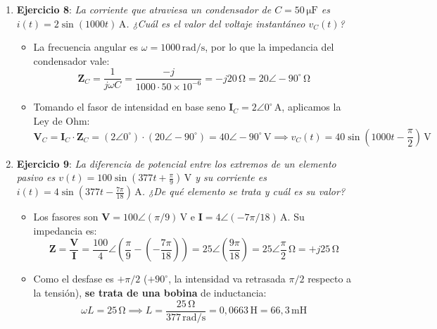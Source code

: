 \begin{ejercicio}
\begin{enumerate}
    \item \textbf{Ejercicio 8}: \emph{La corriente que atraviesa un condensador de $C = 50\,\si{\micro\farad}$ es $i(t) = 2\sin(1000 t)\,\si{\ampere}$. ¿Cuál es el valor del voltaje instantáneo $v_C(t)$?}
    \begin{itemize}
        \item La frecuencia angular es $\omega = 1000\,\si{\radian/\second}$, por lo que la impedancia del condensador vale:
        \begin{equation*}
            \mathbf{Z}_C = \frac{1}{j\omega C} = \frac{-j}{1000 \cdot 50\times 10^{-6}} = -j 20\,\si{\ohm} = 20\angle -90^\circ\,\si{\ohm}
        \end{equation*}
        \item Tomando el fasor de intensidad en base seno $\mathbf{I}_C = 2\angle 0^\circ\,\si{\ampere}$, aplicamos la Ley de Ohm:
        \begin{equation*}
            \mathbf{V}_C = \mathbf{I}_C \cdot \mathbf{Z}_C = (2\angle 0^\circ)\cdot(20\angle -90^\circ) = 40\angle -90^\circ\,\si{\volt} \implies \boxed{v_C(t) = 40\sin\left(1000 t - \frac{\pi}{2}\right)\,\si{\volt}}
        \end{equation*}
    \end{itemize}

    \item \textbf{Ejercicio 9}: \emph{La diferencia de potencial entre los extremos de un elemento pasivo es $v(t) = 100\sin\left(377 t + \frac{\pi}{9}\right)\,\si{\volt}$ y su corriente es $i(t) = 4\sin\left(377 t - \frac{7\pi}{18}\right)\,\si{\ampere}$. ¿De qué elemento se trata y cuál es su valor?}
    \begin{itemize}
        \item Los fasores son $\mathbf{V} = 100\angle(\pi/9)\,\si{\volt}$ e $\mathbf{I} = 4\angle(-7\pi/18)\,\si{\ampere}$. Su impedancia es:
        \begin{equation*}
            \mathbf{Z} = \frac{\mathbf{V}}{\mathbf{I}} = \frac{100}{4}\angle\left(\frac{\pi}{9} - \left(-\frac{7\pi}{18}\right)\right) = 25\angle\left(\frac{9\pi}{18}\right) = 25\angle\frac{\pi}{2}\,\si{\ohm} = +j 25\,\si{\ohm}
        \end{equation*}
        \item Como el desfase es $+\pi/2$ ($+90^\circ$, la intensidad va retrasada $\pi/2$ respecto a la tensión), \textbf{se trata de una bobina} de inductancia:
        \begin{equation*}
            \omega L = 25\,\si{\ohm} \implies \boxed{L = \frac{25\,\si{\ohm}}{377\,\si{\radian/\second}} = 0{,}0663\,\si{\henry} = 66{,}3\,\si{\milli\henry}}
        \end{equation*}
    \end{itemize}


\end{enumerate}
\end{ejercicio}

